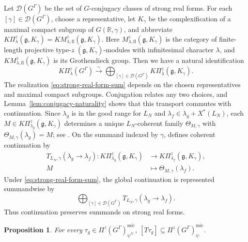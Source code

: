 \documentclass[10pt]{amsart}
\numberwithin{equation}{section}
\theoremstyle{plain}
\newtheorem{proposition}{Proposition}[section]
\theoremstyle{definition}
\theoremstyle{remark}
\newcommand{\RR}{\mathbb R}
\newcommand{\fg}{\mathfrak g}
\newcommand{\mic}{\mathrm{mic}}
\begin{document}
Let $\mathcal D(G^\Gamma)$ be the set of $G$-conjugacy classes of strong
real forms. For each $[\gamma]\in\mathcal D(G^\Gamma)$, choose a
representative, let $K_\gamma$ be the complexification of a maximal
compact subgroup of $G(\RR,\gamma)$, and abbreviate
$K\Pi_\lambda^z(\fg,K_\gamma)=KM_{\lambda,\mathrm{fl}}^z(\fg,K_\gamma)$.
Here $M_{\lambda,\mathrm{fl}}^z(\fg,K_\gamma)$ is the category of finite-length
projective type-$z$ $(\fg,K_\gamma)$-modules with infinitesimal character
$\lambda$, and $KM_{\lambda,\mathrm{fl}}^z(\fg,K_\gamma)$ is its
Grothendieck group.
Then we have a natural identification
\begin{equation}\label{eq:strong-real-form-sum}
 K\Pi_\lambda^z(G^\Gamma)
 \xrightarrow{\ \sim\ }
 \bigoplus_{[\gamma]\in\mathcal D(G^\Gamma)}
 K\Pi_\lambda^z(\fg,K_\gamma).
\end{equation}
The realization \eqref{eq:strong-real-form-sum} depends on the chosen
representatives and maximal compact subgroups. Conjugation relates any two
choices, and Lemma~\ref{lem:conjugacy-naturality} shows that this transport
commutes with continuation. Since $\lambda_g$ is in the good range for
$L_N$ and $\lambda_f\in\lambda_g+X^*(L_N)$, each
$M\in K\Pi_{\lambda_g}^z(\fg,K_\gamma)$ determines a unique
$L_N$-coherent family $\Theta_{M,\gamma}$ with
$\Theta_{M,\gamma}(\lambda_g)=M$; see
\cite[Proposition~2.10.2]{AIMV26}. On the summand indexed by $\gamma$,
\cite[Definition~2.10.3]{AIMV26} defines coherent continuation by
\[
 \begin{aligned}
 T_{L_N,\gamma}(\lambda_g\to\lambda_f):
 K\Pi_{\lambda_g}^z(\fg,K_\gamma)
 &\longrightarrow K\Pi_{\lambda_f}^z(\fg,K_\gamma),\\
 M&\longmapsto\Theta_{M,\gamma}(\lambda_f).
 \end{aligned}
\]
Under
\eqref{eq:strong-real-form-sum}, the global continuation is represented summandwise by
\begin{equation}\label{eq:summandwise-continuation}
 \bigoplus_{[\gamma]\in\mathcal D(G^\Gamma)}
 T_{L_N,\gamma}(\lambda_g\to\lambda_f).
\end{equation}
Thus continuation preserves summands on strong real forms.

\begin{proposition}\label{prop:continuation}
For every $\tau_g\in\Pi^z(G^\Gamma)^{\mic}_{\psi^N}$,
$[T\tau_g]\subseteq\Pi^z(G^\Gamma)^{\mic}_{\psi}$.
\end{proposition}
\end{document}
